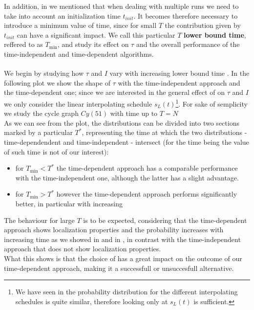         \noindent
        In addition, in   we mentioned that when dealing with multiple runs we need to take into account an initialization time $t_{init}$. It becomes therefore necessary to introduce a minimum value of time, since for small $T$ the contribution given by $t_{init}$ can have a significant impact. We call this particular $T$ \textbf{lower bound time}, reffered to as $T_{\min}$, and study its effect on $\tau$ and the overall performance of the time-independent and time-dependent algorithms. \\ \\

         We begin by studying how $\tau$ and $I$ vary with increasing lower bound time \tmin.
         In the following plot we show the shape of $\tau$ with the time-independent approach and the time-dependent one; since we are interested in the general effect of \tmin on $\tau$ and $I$ we only consider the linear interpolating schedule $s_L(t)$\footnote{We have seen in  the probability distribution for the different interpolating schedules is quite similar, therefore looking only at $s_L(t)$ is sufficient.}. For sake of semplicity we study the cycle graph $Cy(51)$ with time up to $T=N$\\
         

        As we can see from the plot, the distributions can be divided into two sections marked by a particular $T^*$, representing the time at which the two distributions - time-dependendent and time-independent - intersect (for the time being the value of such time is not of our interest):
        \begin{itemize}
            \item for $T_{\min}<T^*$ the time-dependent approach has a comparable performance with the time-independent one, although the latter has a slight advantage.
            \item for $T_{\min}>T^*$ however the time-dependent approach performs significantly better, in particular with increasing \tmin
        \end{itemize}
        The behaviour for large $T$ is to be expected, considering that the time-dependent approach shows localization properties and the probability increases with increasing time as we showed in  and in , in contrast with the time-independent approach that does not show localization properties.\\ What this shows is that the choice of \tmin has a great impact on the outcome of our time-dependent approach, making it a successfull or unsuccesfull alternative. \\

